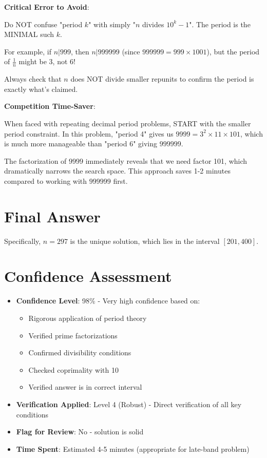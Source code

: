 \documentclass[11pt]{article}
\begin{document}
\begin{warningbox}
\textbf{Critical Error to Avoid}: 

Do NOT confuse "period $k$" with simply "$n$ divides $10^k - 1$". The period is the MINIMAL such $k$. 

For example, if $n | 999$, then $n | 999999$ (since $999999 = 999 \times 1001$), but the period of $\frac{1}{n}$ might be 3, not 6!

Always check that $n$ does NOT divide smaller repunits to confirm the period is exactly what's claimed.
\end{warningbox}

\begin{tipbox}
\textbf{Competition Time-Saver}: 

When faced with repeating decimal period problems, START with the smaller period constraint. In this problem, "period 4" gives us $9999 = 3^2 \times 11 \times 101$, which is much more manageable than "period 6" giving $999999$.

The factorization of $9999$ immediately reveals that we need factor 101, which dramatically narrows the search space. This approach saves 1-2 minutes compared to working with $999999$ first.
\end{tipbox}

\section*{Final Answer}

Specifically, $n = 297$ is the unique solution, which lies in the interval $[201, 400]$.

\section*{Confidence Assessment}
\begin{itemize}[leftmargin=*]
    \item \textbf{Confidence Level}: 98\% - Very high confidence based on:
    \begin{itemize}
        \item Rigorous application of period theory
        \item Verified prime factorizations
        \item Confirmed divisibility conditions
        \item Checked coprimality with 10
        \item Verified answer is in correct interval
    \end{itemize}
    \item \textbf{Verification Applied}: Level 4 (Robust) - Direct verification of all key conditions
    \item \textbf{Flag for Review}: No - solution is solid
    \item \textbf{Time Spent}: Estimated 4-5 minutes (appropriate for late-band problem)
\end{itemize}
\end{document}
